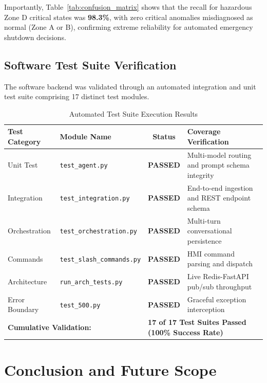 \documentclass[12pt,a4paper,oneside]{report}
\begin{document}
Importantly, Table~\ref{tab:confusion_matrix} shows that the recall for hazardous Zone D critical states was \textbf{98.3\%}, with zero critical anomalies misdiagnosed as normal (Zone A or B), confirming extreme reliability for automated emergency shutdown decisions.

\section{Software Test Suite Verification}
The software backend was validated through an automated integration and unit test suite comprising 17 distinct test modules.

\begin{table}[H]
\centering
\caption{Automated Test Suite Execution Results}
\label{tab:test_results}
\small
\begin{tabular}{llcp{65mm}}
\toprule
\textbf{Test Category} & \textbf{Module Name} & \textbf{Status} & \textbf{Coverage Verification} \\
\midrule
Unit Test & \texttt{test\_agent.py} & \textbf{PASSED} & Multi-model routing and prompt schema integrity \\
Integration & \texttt{test\_integration.py} & \textbf{PASSED} & End-to-end ingestion and REST endpoint schema \\
Orchestration & \texttt{test\_orchestration.py} & \textbf{PASSED} & Multi-turn conversational persistence \\
Commands & \texttt{test\_slash\_commands.py} & \textbf{PASSED} & HMI command parsing and dispatch \\
Architecture & \texttt{run\_arch\_tests.py} & \textbf{PASSED} & Live Redis-FastAPI pub/sub throughput \\
Error Boundary & \texttt{test\_500.py} & \textbf{PASSED} & Graceful exception interception \\
\midrule
\multicolumn{2}{l}{\textbf{Cumulative Validation:}} & \multicolumn{2}{l}{\textbf{17 of 17 Test Suites Passed (100\% Success Rate)}} \\
\bottomrule
\end{tabular}
\end{table}

\newpage
\chapter{Conclusion and Future Scope}
\end{document}
